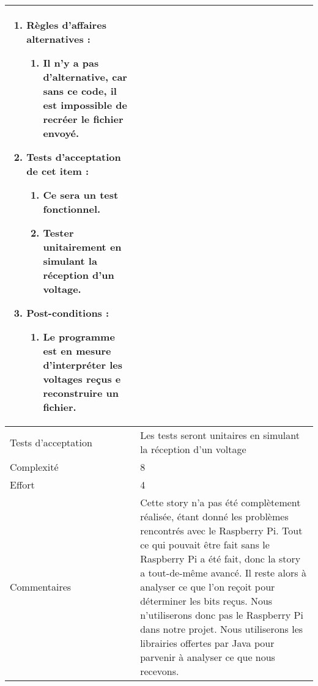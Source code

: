 \begin{longtable}{|l|p{}|}
\begin{enumerate}[label*=\arabic*.]
\begin{enumerate}[label*=\arabic*.]
\begin{enumerate}[label*=\arabic*.]
                                \end{enumerate}
                                \item Règles d'affaires alternatives :
                                \begin{enumerate}[label*=\arabic*.]
                                    \item Il n'y a pas d'alternative, car sans ce code, il est impossible de recréer le fichier envoyé.
                                \end{enumerate}
                                \item Tests d'acceptation de cet item :
                                \begin{enumerate}[label*=\arabic*.]
                                    \item Ce sera un test fonctionnel.
                                    \item Tester unitairement en simulant la réception d'un voltage. 
                                \end{enumerate}
                                \item Post-conditions :
                                \begin{enumerate}[label*=\arabic*.]
                                    \item Le programme est en mesure d'interpréter les voltages reçus e reconstruire un fichier.
                                \end{enumerate}
                            \end{enumerate}
                               \end{enumerate} \\

\hline
    Tests d'acceptation & Les tests seront unitaires en simulant la réception d'un voltage \\
\hline
    Complexité & 8 \\
\hline
    Effort & 4 \\
\hline
    Commentaires & Cette story n'a pas été complètement réalisée, étant donné les problèmes rencontrés avec le Raspberry Pi. Tout ce qui pouvait être fait sans le Raspberry Pi a été fait, donc la story a tout-de-même avancé. Il reste alors à analyser ce que l'on reçoit pour déterminer les bits reçus. Nous n'utiliserons donc pas le Raspberry Pi dans notre projet. Nous utiliserons les librairies offertes par Java pour parvenir à analyser ce que nous recevons. \\
\hline
\end{longtable}
